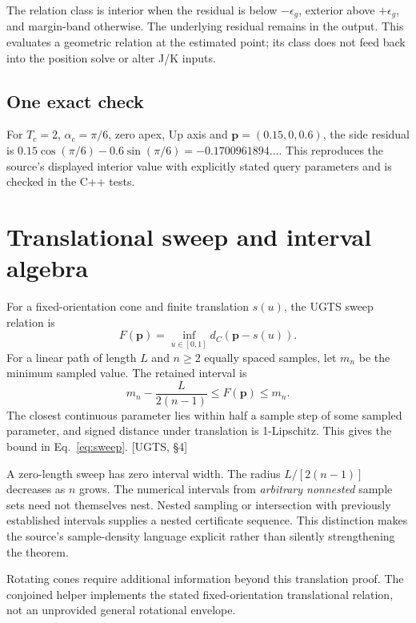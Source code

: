 \documentclass[11pt,a4paper]{article}
\newcommand{\uRef}[1]{\textcolor{muted}{[UGTS, #1]}}
\begin{document}
The relation class is interior when the residual is below $-\epsilon_g$, exterior above $+\epsilon_g$, and
margin-band otherwise. The underlying residual remains in the output. This evaluates a geometric relation at
the estimated point; its class does not feed back into the position solve or alter J/K inputs.

\subsection{One exact check}
For $T_c=2$, $\alpha_c=\pi/6$, zero apex, Up axis and $\mathbf p=(0.15,0,0.6)$, the side residual is
$0.15\cos(\pi/6)-0.6\sin(\pi/6)=-0.1700961894\ldots$. This reproduces the source's displayed interior value
with explicitly stated query parameters and is checked in the C++ tests.
\clearpage

\section{Translational sweep and interval algebra}
For a fixed-orientation cone and finite translation $s(u)$, the UGTS sweep relation is
\begin{equation}
F(\mathbf p)=\inf_{u\in[0,1]}d_C(\mathbf p-s(u)).
\end{equation}
For a linear path of length $L$ and $n\ge2$ equally spaced samples, let $m_n$ be the minimum sampled value.
The retained interval is
\begin{equation}\label{eq:sweep}
m_n-\frac{L}{2(n-1)}\le F(\mathbf p)\le m_n.
\end{equation}
The closest continuous parameter lies within half a sample step of some sampled parameter, and signed
distance under translation is 1-Lipschitz. This gives the bound in Eq.~\eqref{eq:sweep}. \uRef{\S4}

A zero-length sweep has zero interval width. The radius $L/[2(n-1)]$ decreases as $n$ grows. The numerical
intervals from \emph{arbitrary nonnested} sample sets need not themselves nest. Nested sampling or intersection
with previously established intervals supplies a nested certificate sequence. This distinction makes the source's
sample-density language explicit rather than silently strengthening the theorem.

Rotating cones require additional information beyond this translation proof. The conjoined helper implements
the stated fixed-orientation translational relation, not an unprovided general rotational envelope.
\end{document}

